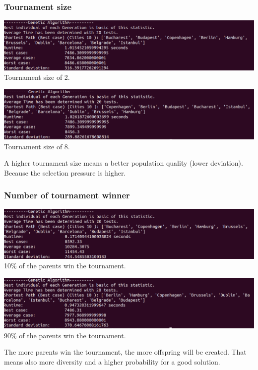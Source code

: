 \documentclass[10pt,a4paper]{article}
\begin{document}
	\subsubsection{Tournament size}
	\begin{center}
		\includegraphics[width=1\linewidth]{pictures/geneticAlgorithm/2tourn}
		\\
		Tournament size of 2.
		\\
	\end{center}
	\begin{center}
		\includegraphics[width=1\linewidth]{pictures/geneticAlgorithm/8tourn}
			\\
		Tournament size of 8.
		\\
	\end{center}
	A higher tournament size means a better population quality (lower deviation). Because the selection pressure is higher.
	
	\subsubsection{Number of tournament winner}
	\begin{center}
		\includegraphics[width=1\linewidth]{pictures/geneticAlgorithm/tournwin10}
		\\
		10\% of the parents win the tournament. 
		\\
	\end{center}
	\begin{center}
		\includegraphics[width=1\linewidth]{pictures/geneticAlgorithm/tournwin90}
			\\
		90\% of the parents win the tournament. 
		\\
	\end{center}
	The more parents win the tournament, the more offspring will be created. That means also more diversity and a higher probability for a good solution.
	
\end{document}
